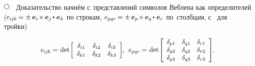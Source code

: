 \begin{otherlanguage}{russian}
\noindent
${ \tikz[baseline=-1ex] \draw [line width=.5pt, color=black, fill=white] (0, 0) circle (.8ex);
\hspace{.6em} }$
Доказательство начнём с~представлений символов Веблена как определителей
(${ e_{i\hspace{-0.1ex}j\hspace{-0.1ex}k} \hspace{-0.2ex}
= \pm \hspace{.4ex}
\bm{e}_i \hspace{-0.36ex} \times \hspace{-0.2ex} \bm{e}_j \hspace{-0.15ex} \dotp \hspace{.1ex} \bm{e}_k }$ по строкам,
${ e_{pqr} \hspace{-0.2ex}
= \pm \hspace{.4ex}
\bm{e}_p \hspace{-0.36ex} \times \hspace{-0.2ex} \bm{e}_q \hspace{-0.15ex} \dotp \hspace{.1ex} \bm{e}_r }$ по~столбцам,
с~\inquotes{$-$} для~ тройки)

\nopagebreak\vspace{-0.25em}\begin{equation*}
e_{i\hspace{-0.1ex}j\hspace{-0.1ex}k} \hspace{-0.1ex} = \hspace{.1ex}
\operatorname{det}\hspace{-0.25ex} \scalebox{0.96}[0.96]{$\left[\begin{array}{ccc}
\delta_{i1} & \delta_{i2} & \delta_{i3} \\
\delta_{k1} & \delta_{k2} & \delta_{k3}
\end{array}\right]$} \hspace{-0.25ex}, \:\:
e_{pqr} \hspace{-0.1ex} = \hspace{.1ex}
\operatorname{det}\hspace{-0.25ex} \scalebox{0.96}[0.96]{$\left[\begin{array}{ccc}
\delta_{p1} & \delta_{q1} & \delta_{r1} \\
\delta_{p2} & \delta_{q2} & \delta_{r2} \\
\delta_{p3} & \delta_{q3} & \delta_{r3}
\end{array}\right]$}
\hspace{-0.2ex} .
\end{equation*}


\end{otherlanguage}
